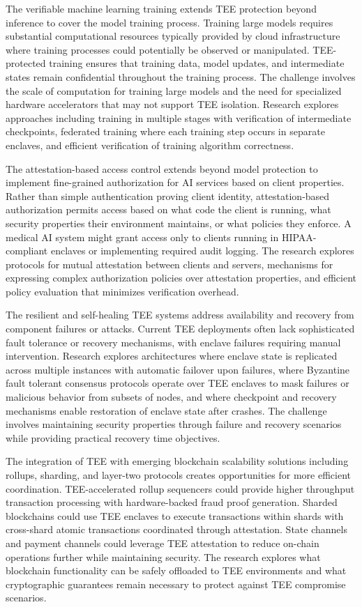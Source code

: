 The verifiable machine learning training extends TEE protection beyond inference to cover the model training process. Training large models requires substantial computational resources typically provided by cloud infrastructure where training processes could potentially be observed or manipulated. TEE-protected training ensures that training data, model updates, and intermediate states remain confidential throughout the training process. The challenge involves the scale of computation for training large models and the need for specialized hardware accelerators that may not support TEE isolation. Research explores approaches including training in multiple stages with verification of intermediate checkpoints, federated training where each training step occurs in separate enclaves, and efficient verification of training algorithm correctness.

The attestation-based access control extends beyond model protection to implement fine-grained authorization for AI services based on client properties. Rather than simple authentication proving client identity, attestation-based authorization permits access based on what code the client is running, what security properties their environment maintains, or what policies they enforce. A medical AI system might grant access only to clients running in HIPAA-compliant enclaves or implementing required audit logging. The research explores protocols for mutual attestation between clients and servers, mechanisms for expressing complex authorization policies over attestation properties, and efficient policy evaluation that minimizes verification overhead.

The resilient and self-healing TEE systems address availability and recovery from component failures or attacks. Current TEE deployments often lack sophisticated fault tolerance or recovery mechanisms, with enclave failures requiring manual intervention. Research explores architectures where enclave state is replicated across multiple instances with automatic failover upon failures, where Byzantine fault tolerant consensus protocols operate over TEE enclaves to mask failures or malicious behavior from subsets of nodes, and where checkpoint and recovery mechanisms enable restoration of enclave state after crashes. The challenge involves maintaining security properties through failure and recovery scenarios while providing practical recovery time objectives.

The integration of TEE with emerging blockchain scalability solutions including rollups, sharding, and layer-two protocols creates opportunities for more efficient coordination. TEE-accelerated rollup sequencers could provide higher throughput transaction processing with hardware-backed fraud proof generation. Sharded blockchains could use TEE enclaves to execute transactions within shards with cross-shard atomic transactions coordinated through attestation. State channels and payment channels could leverage TEE attestation to reduce on-chain operations further while maintaining security. The research explores what blockchain functionality can be safely offloaded to TEE environments and what cryptographic guarantees remain necessary to protect against TEE compromise scenarios.

